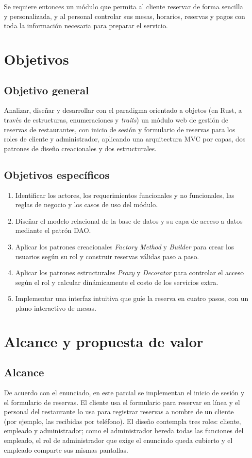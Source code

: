 \documentclass[12pt]{article}
\begin{document}
Se requiere entonces un módulo que permita al cliente reservar de forma sencilla y personalizada, y al personal controlar sus mesas, horarios, reservas y pagos con toda la información necesaria para preparar el servicio.

\section{Objetivos}
\subsection{Objetivo general}
Analizar, diseñar y desarrollar con el paradigma orientado a objetos (en Rust, a través de estructuras, enumeraciones y \textit{traits}) un módulo web de gestión de reservas de restaurantes, con inicio de sesión y formulario de reservas para los roles de cliente y administrador, aplicando una arquitectura MVC por capas, dos patrones de diseño creacionales y dos estructurales.
\subsection{Objetivos específicos}
\begin{enumerate}
  \item Identificar los actores, los requerimientos funcionales y no funcionales, las reglas de negocio y los casos de uso del módulo.
  \item Diseñar el modelo relacional de la base de datos y su capa de acceso a datos mediante el patrón DAO.
  \item Aplicar los patrones creacionales \textit{Factory Method} y \textit{Builder} para crear los usuarios según su rol y construir reservas válidas paso a paso.
  \item Aplicar los patrones estructurales \textit{Proxy} y \textit{Decorator} para controlar el acceso según el rol y calcular dinámicamente el costo de los servicios extra.
  \item Implementar una interfaz intuitiva que guíe la reserva en cuatro pasos, con un plano interactivo de mesas.
\end{enumerate}

\section{Alcance y propuesta de valor}
\subsection{Alcance}
De acuerdo con el enunciado, en este parcial se implementan el inicio de sesión y el formulario de reservas. El cliente usa el formulario para reservar en línea y el personal del restaurante lo usa para registrar reservas a nombre de un cliente (por ejemplo, las recibidas por teléfono). El diseño contempla tres roles: cliente, empleado y administrador; como el administrador hereda todas las funciones del empleado, el rol de administrador que exige el enunciado queda cubierto y el empleado comparte sus mismas pantallas.
\end{document}
